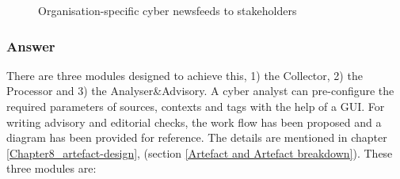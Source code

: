 \begin{figure}[ht]
\centering
    \caption{Organisation-specific cyber newsfeeds to stakeholders}
    \label{fig:tailored}
\end{figure}
 \subsubsection{Answer}
There are three modules designed to achieve this, 1) the Collector, 2) the Processor and 3) the Analyser\&Advisory. 
A cyber analyst can pre-configure the required parameters of sources, contexts and tags with the help of a GUI. 
For writing advisory and editorial checks, the work flow has been proposed and a diagram has been provided for reference. 
The details are mentioned in chapter \ref{Chapter8_artefact-design},
(section \ref{Artefact and Artefact breakdown}). 
These three modules are: 
 

